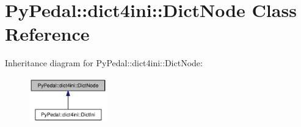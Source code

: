 \hypertarget{classPyPedal_1_1dict4ini_1_1DictNode}{
\section{PyPedal::dict4ini::DictNode Class Reference}
\label{classPyPedal_1_1dict4ini_1_1DictNode}
}
Inheritance diagram for PyPedal::dict4ini::DictNode:\nopagebreak
\begin{figure}[H]
\begin{center}
\leavevmode
\includegraphics[width=95pt]{classPyPedal_1_1dict4ini_1_1DictNode__inherit__graph}
\end{center}
\end{figure}
